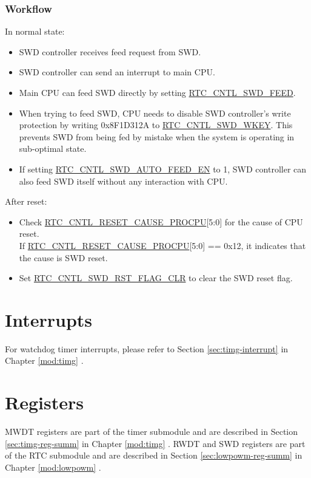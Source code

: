 \documentclass[main\_\_EN.tex]{subfiles}
\begin{document}
\subsubsection{Workflow}
In normal state:
\begin{itemize}
    \item SWD controller receives feed request from SWD.
    \item SWD controller can send an interrupt to main CPU.
    \item Main CPU can feed SWD directly by setting \hyperref[fielddesc:RTCCNTLSWDFEED]{RTC\_CNTL\_SWD\_FEED}.
    \item When trying to feed SWD, CPU needs to disable SWD controller's write protection by writing 0x8F1D312A to \hyperref[fielddesc:RTCCNTLSWDWKEY]{RTC\_CNTL\_SWD\_WKEY}. This prevents SWD from being fed by mistake when the system is operating in sub-optimal state.
    \item If setting \hyperref[fielddesc:RTCCNTLSWDAUTOFEEDEN]{RTC\_CNTL\_SWD\_AUTO\_FEED\_EN} to 1, SWD controller can also feed SWD itself without any interaction with CPU.
\end{itemize}

After reset:
\begin{itemize}
    \item Check \hyperref[fielddesc:RTCCNTLRESETCAUSEPROCPU]{RTC\_CNTL\_RESET\_CAUSE\_PROCPU}[5:0] for the cause of CPU reset.\\
	If \hyperref[fielddesc:RTCCNTLRESETCAUSEPROCPU]{RTC\_CNTL\_RESET\_CAUSE\_PROCPU}[5:0] == 0x12, it indicates that the cause is SWD reset.
	\item Set \hyperref[fielddesc:RTCCNTLSWDRSTFLAGCLR]{RTC\_CNTL\_SWD\_RST\_FLAG\_CLR} to clear the SWD reset flag.
\end{itemize}

\section{Interrupts}

For watchdog timer interrupts, please refer to Section \ref{sec:timg-interrupt} \textit{} in Chapter \ref{mod:timg} \textit{}.

\section{Registers}
MWDT registers are part of the timer submodule and are described in Section \ref{sec:timg-reg-summ} \textit{} in Chapter \ref{mod:timg} \textit{}. RWDT and SWD registers are part of the RTC submodule and are described in Section \ref{sec:lowpowm-reg-summ} \textit{} in Chapter \ref{mod:lowpowm} \textit{}.
\end{document}
